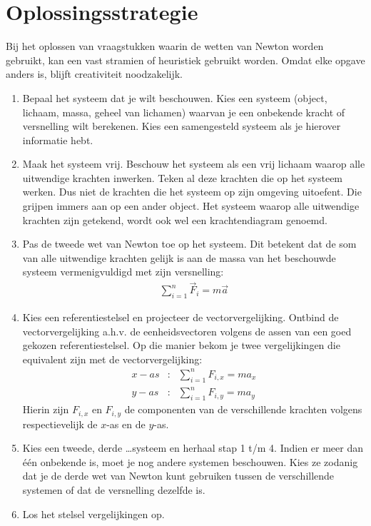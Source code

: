 \documentclass{ximera}
\begin{document}
	\author{Bart Lambregs}





	\section{Oplossingsstrategie}

	Bij het oplossen van vraagstukken waarin de wetten van Newton worden gebruikt, kan een vast stramien of heuristiek gebruikt worden. Omdat elke opgave anders is, blijft creativiteit noodzakelijk.
	\begin{enumerate}
	\item Bepaal het systeem dat je wilt beschouwen. Kies een systeem (object, lichaam, massa, geheel van lichamen) waarvan je een onbekende kracht of versnelling wilt berekenen. Kies een samengesteld systeem als je hierover informatie hebt.
	\item Maak het systeem vrij. Beschouw het systeem als een vrij lichaam waarop alle uitwendige krachten inwerken. Teken al deze krachten die op het systeem werken. Dus niet de krachten die het systeem op zijn omgeving uitoefent. Die grijpen immers aan op een ander object. Het systeem waarop alle uitwendige krachten zijn getekend, wordt ook wel een krachtendiagram genoemd.
	\item Pas de tweede wet van Newton toe op het systeem. Dit betekent dat de som van alle uitwendige krachten gelijk is aan de massa van het beschouwde systeem vermenigvuldigd met zijn versnelling:
	\begin{eqnarray*}
	\sum_{i=1}^n\vec{F}_i=m\vec{a}
	\end{eqnarray*}
	\item Kies een referentiestelsel en projecteer de vectorvergelijking. Ontbind de vectorvergelijking a.h.v. de eenheidsvectoren volgens de assen van een goed gekozen referentiestelsel. Op die manier bekom je
	twee vergelijkingen die equivalent zijn met de vectorvergelijking:
	\begin{eqnarray*}
	x-as&:&\sum_{i=1}^nF_{i,x}=ma_x\\
	y-as&:&\sum_{i=1}^nF_{i,y}=ma_y
	\end{eqnarray*}
	Hierin zijn $F_{i,x}$ en $F_{i,y}$ de componenten van de verschillende krachten volgens respectievelijk de $x$-as en de $y$-as.
	\item Kies een tweede, derde \ldots systeem en herhaal stap 1 t/m 4. Indien er meer dan \'e\'en onbekende is, moet je nog andere systemen beschouwen. Kies ze zodanig dat je de derde wet van Newton kunt gebruiken tussen de verschillende systemen of dat de versnelling dezelfde is.
	\item Los het stelsel vergelijkingen op.
	\end{enumerate}
	
\end{document}
